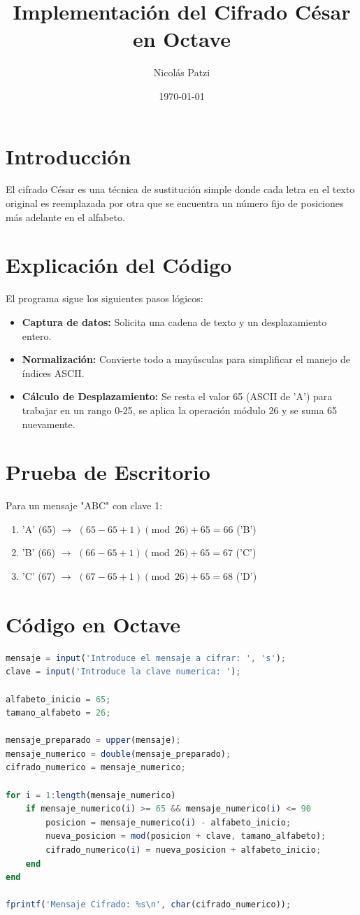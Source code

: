 \documentclass[12pt]{article}
\title{Implementación del Cifrado César en Octave}
\author{Nicolás Patzi}
\date{\today}
\begin{document}
\maketitle

\section{Introducción}
El cifrado César es una técnica de sustitución simple donde cada letra en el texto original es reemplazada por otra que se encuentra un número fijo de posiciones más adelante en el alfabeto.

\section{Explicación del Código}
El programa sigue los siguientes pasos lógicos:
\begin{itemize}
    \item \textbf{Captura de datos:} Solicita una cadena de texto y un desplazamiento entero.
    \item \textbf{Normalización:} Convierte todo a mayúsculas para simplificar el manejo de índices ASCII.
    \item \textbf{Cálculo de Desplazamiento:} Se resta el valor 65 (ASCII de 'A') para trabajar en un rango 0-25, se aplica la operación módulo 26 y se suma 65 nuevamente.
\end{itemize}

\section{Prueba de Escritorio}
Para un mensaje "ABC" con clave 1:
\begin{enumerate}
    \item 'A' (65) $\rightarrow$ $(65-65+1) \pmod{26} + 65 = 66$ ('B')
    \item 'B' (66) $\rightarrow$ $(66-65+1) \pmod{26} + 65 = 67$ ('C')
    \item 'C' (67) $\rightarrow$ $(67-65+1) \pmod{26} + 65 = 68$ ('D')
\end{enumerate}

\section{Código en Octave}
\begin{lstlisting}[language=Octave, style=octavestyle]
% Entrada de datos
mensaje = input('Introduce el mensaje a cifrar: ', 's'); 
clave = input('Introduce la clave numerica: ');

alfabeto_inicio = 65; 
tamano_alfabeto = 26;

mensaje_preparado = upper(mensaje);
mensaje_numerico = double(mensaje_preparado);
cifrado_numerico = mensaje_numerico;

for i = 1:length(mensaje_numerico)
    if mensaje_numerico(i) >= 65 && mensaje_numerico(i) <= 90
        posicion = mensaje_numerico(i) - alfabeto_inicio;
        nueva_posicion = mod(posicion + clave, tamano_alfabeto);
        cifrado_numerico(i) = nueva_posicion + alfabeto_inicio;
    end
end

fprintf('Mensaje Cifrado: %s\n', char(cifrado_numerico));
\end{lstlisting}
\end{document}
